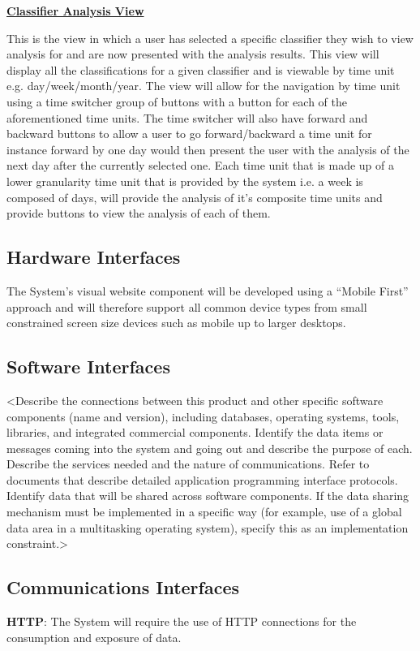 \documentclass[11pt]{report}
\begin{document}
\textbf{\underline{Classifier Analysis View}}

This is the view in which a user has selected a specific classifier they wish to view analysis for and are now presented with the analysis results. This view will display all the classifications for a given classifier and is viewable by time unit e.g. day/week/month/year. The view will allow for the navigation by time unit using a time switcher group of buttons with a button for each of the aforementioned time units. The time switcher will also have forward and backward buttons to allow a user to go forward/backward a time unit for instance forward by one day would then present the user with the analysis of the next day after the currently selected one. Each time unit that is made up of a lower granularity time unit that is provided by the system i.e. a week is composed of days, will provide the analysis of it's composite time units and provide buttons to view the analysis of each of them.

\subsection*{Hardware Interfaces}
The System’s visual website component will be developed using a “Mobile First” approach and will therefore support all common device types from small constrained screen size devices such as mobile up to larger desktops.

\subsection*{Software Interfaces}
<Describe the connections between this product and other specific software components (name and version), including databases, operating systems, tools, libraries, and integrated commercial components. Identify the data items or messages coming into the system and going out and describe the purpose of each. Describe the services needed and the nature of communications. Refer to documents that describe detailed application programming interface protocols. Identify data that will be shared across software components. If the data sharing mechanism must be implemented in a specific way (for example, use of a global data area in a multitasking operating system), specify this as an implementation constraint.>

\subsection*{Communications Interfaces}
\textbf{HTTP}: The System will require the use of HTTP connections for the consumption and exposure of data.
\end{document}
